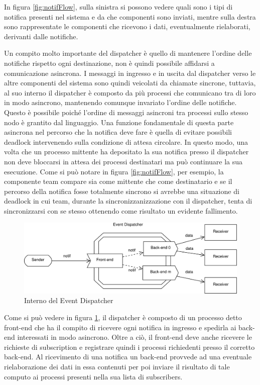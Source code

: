\documentclass[11pt,a4paper]{report}
\begin{document}
In figura \ref{fig:notifFlow}, sulla sinistra si possono vedere quali sono i tipi di notifica presenti nel sistema e da che componenti sono inviati, mentre sulla destra sono rappresentate le componenti che ricevono i dati, eventualmente rielaborati, derivanti dalle notifiche.

Un compito molto importante del dispatcher è quello di mantenere l'ordine delle notifiche rispetto ogni destinazione, non è quindi possibile affidarsi a comunicazione asincrona.
I messaggi in ingresso e in uscita dal dispatcher verso le altre componenti del sistema sono quindi veicolati da chiamate sincrone, tuttavia, al suo interno il dispatcher è composto da più processi che comunicano tra di loro in modo asincrono, mantenendo comunque invariato l'ordine delle notifiche.
Questo è possibile poiché l'ordine di messaggi asincroni tra processi sullo stesso nodo è grantito dal linguaggio. Una funzione fondamentale di questa parte asincrona nel percorso che la notifica deve fare è quella di evitare possibili deadlock intervenendo sulla condizione di attesa circolare. In questo modo, una volta che un processo mittente ha depositato la sua notifica presso il dispatcher non deve bloccarsi in attesa dei processi destinatari ma può continuare la sua esecuzione.
Come si può notare in figura \ref{fig:notifFlow}, per esempio, la componente team compare sia come mittente che come destinatario e se il percorso della notifica fosse totalmente sincrono si avrebbe una situazione di deadlock in cui team, durante la sincronizzanizzazione con il dispatcher, tenta di sincronizzarsi con se stesso ottenendo come risultato un evidente fallimento.
\begin{figure}
\includegraphics[width=\textwidth]{diagrammi/Dispatcher}
\caption{Interno del Event Dispatcher}
\label{fig:dispatcher}
\end{figure}

Come si può vedere in figura \ref{fig:dispatcher}, il dispatcher è composto di un processo detto front-end che ha il compito di ricevere ogni notifica in ingresso e spedirla ai back-end interessati in modo asincrono. Oltre a ciò, il front-end deve anche ricevere le richieste di subscription e registrare quindi i processi richiedenti presso il corretto back-end. Al ricevimento di una notifica un back-end provvede ad una eventuale rielaborazione dei dati in essa contenuti per poi inviare il risultato di tale computo ai processi presenti nella sua lista di subscribers.
\end{document}
